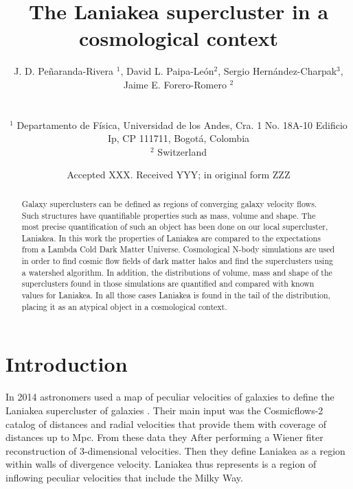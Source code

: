 \documentclass[usenatbib]{mnras}
\title[Laniakea in context]{The Laniakea supercluster in a cosmological context}
\author[Barrera et al.]{
\parbox[t]{\textwidth}{
    {J. D. Pe\~naranda-Rivera $^1$,} 
    {David L.  Paipa-Le\'on$^{2}$,}
    {Sergio Hern\'andez-Charpak$^3$,}\\
    {Jaime E. Forero-Romero $^{2}$}
}
\\\\
$^{1}$ Departamento de F\'isica, Universidad de los Andes, Cra. 1
  No. 18A-10 Edificio Ip, CP 111711, Bogot\'a, Colombia \\
$^{2}$ Switzerland\\
}
\date{Accepted XXX. Received YYY; in original form ZZZ}
\begin{document}
\label{firstpage}
\pagerange{\pageref{firstpage}--\pageref{lastpage}}
\maketitle

\maketitle
\begin{abstract}
Galaxy superclusters can be defined as regions of converging galaxy velocity flows.
Such structures have quantifiable properties such as mass, volume and shape.
The most precise quantification of such an object has been done on our local supercluster, Laniakea. 
In this work the properties of Laniakea are compared to the expectations from a Lambda Cold Dark Matter Universe.
Cosmological N-body simulations are used in order to find cosmic flow fields of dark matter halos and find the superclusters using a watershed algorithm.
In addition, the distributions of volume, mass and shape of the superclusters found in those simulations are quantified and compared with known values for Laniakea.
In all those cases Laniakea is found in the tail of the distribution, placing it as an atypical object in a cosmological context. 
\end{abstract}

\begin{keywords}
\end{keywords}




\section{Introduction}

In 2014 astronomers used a map  of peculiar velocities of galaxies to
define the Laniakea supercluster of galaxies
\citep{2014Natur.513...71T}.  
Their main input was the Cosmicflows-2 catalog of distances and radial
velocities that provide them with coverage of distances up to Mpc. 
From these data they After performing a Wiener fiter reconstruction of
3-dimensional velocities.
Then they define Laniakea as  a region within walls of divergence velocity.  
Laniakea thus represents is a region of inflowing peculiar velocities
that include the Milky Way. 
\end{document}
